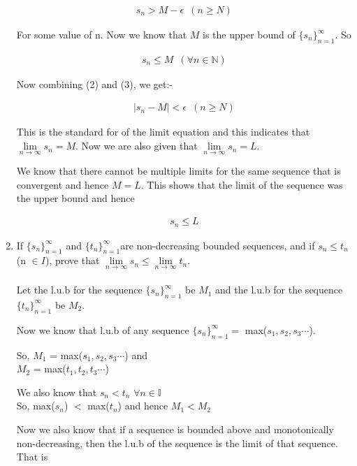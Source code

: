 \documentclass[11pt, letterpaper]{article}
\begin{document}
\begin{enumerate}
{	\begin{eqnarray}
		s_n > M - \epsilon \,\,\, (n \geq N)
	\end{eqnarray}
	
	For some value of n. Now we know that $M$ is the upper bound of $ \lbrace s_n \rbrace_{n=1}^\infty $. So
	
	\begin{eqnarray}
		s_n \leq M \,\,\, (\forall n \in \mathbb{N})
	\end{eqnarray}
	
	Now combining (2) and (3), we get:-
	
	\begin{eqnarray}
		\left| s_n - M \right| < \epsilon \,\,\, (n \geq N)
	\end{eqnarray}
	
	This is the standard for of the limit equation and this indicates that $\lim \limits_{n \to \infty} s_n = M$. Now we are also given that $\lim \limits_{n \to \infty} s_n=L$.
	
	We know that there cannot be multiple limits for the same sequence that is convergent and hence $M = L$. This shows that the limit of the sequence was the upper bound and hence 
	
	\begin{eqnarray}
		s_n \leq L \nonumber 
	\end{eqnarray}
}

\clearpage

\item{If $ \lbrace s_n \rbrace_{n=1}^\infty $ and $ \lbrace t_n \rbrace_{n=1}^\infty $are non-decreasing bounded sequences, and if $s_n \leq t_n$ (n $\in I$), prove that $\lim \limits_{n \to \infty} s_n \leq \lim \limits_{n \to \infty} t_n$. \\\\
	Let the l.u.b for the sequence $ \lbrace s_n \rbrace_{n=1}^\infty $ be $M_1$ and the l.u.b for the sequence $ \lbrace t_n \rbrace_{n=1}^\infty $ be $M_2$.
	
	Now we know that l.u.b of any sequence $ \lbrace s_n \rbrace_{n=1}^\infty =$ max($s_1, s_2, s_3 \cdots$).
	
	So, $M_1$ = max($s_1, s_2, s_3 \cdots$) and\\
	$M_2$ = max($t_1,  t_2, t_3 \cdots$)
	
	We also know that $s_n < t_n \,\, \forall n \in \mathbb{I}$\\
	So, max($s_n$) $<$ max($t_n$) and hence $M_1 < M_2$
	
	Now we also know that if a sequence is bounded above and monotonically non-decreasing, then the l.u.b of the sequence is the limit of that sequence. That is 
	
}
\end{enumerate}
\end{document}

